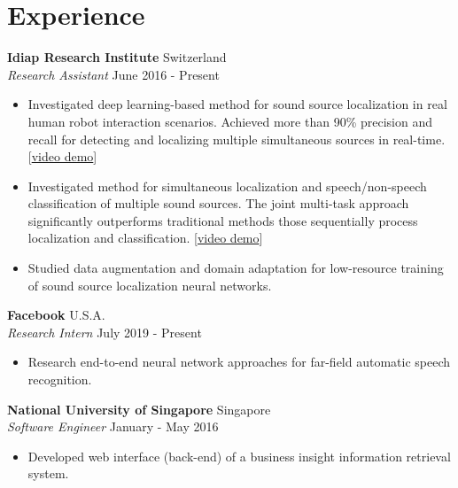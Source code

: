 \documentclass[a4paper,11pt]{article} %
\begin{document}

\section{Experience}

\textbf{Idiap Research Institute}  \hfill Switzerland \\
\textit{Research Assistant} \hfill June 2016 - Present
\vspace{-.9\parskip}
\begin{itemize}
  \item Investigated deep learning-based method for sound source localization in real human robot interaction scenarios. Achieved more than 90\% precision and recall for detecting and localizing multiple simultaneous sources in real-time.
    [\href{https://www.youtube.com/watch?v=_4EwuVlE_pU}{video demo}]
  \item Investigated method for simultaneous localization and speech/non-speech classification of multiple sound sources. The joint multi-task approach significantly outperforms traditional methods those sequentially process localization and classification.
    [\href{https://www.youtube.com/watch?v=O7bQvg03RTc}{video demo}]
  \item Studied data augmentation and domain adaptation for low-resource training of sound source localization neural networks.
\end{itemize}


\textbf{Facebook}  \hfill U.S.A. \\
\textit{Research Intern} \hfill July 2019 - Present
\vspace{-.9\parskip}
\begin{itemize}
  \item Research end-to-end neural network approaches for far-field automatic speech recognition.
\end{itemize}


\textbf{National University of Singapore}  \hfill Singapore \\
\textit{Software Engineer} \hfill January - May 2016
\vspace{-.9\parskip}
\begin{itemize}
  \item Developed web interface (back-end) of a business insight information retrieval system.
\end{itemize}
\end{document}
